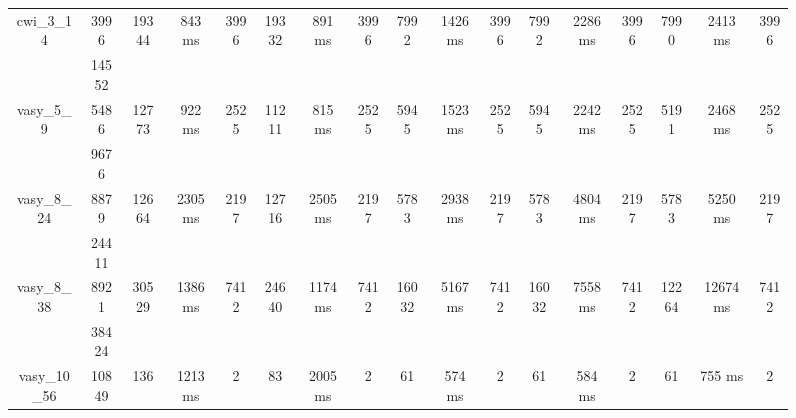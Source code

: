 \documentclass[../master/master.tex]{subfiles}
\begin{document}
\begin{figure}
\begin{adjustbox}{angle=90}
\begin{tabular}{ |c|c||c|c|c||c|c|c||c|c|c||c|c|c||c|c|c|| }
\hline
\multirow{2}{3.6em}{cwi\_3\_14} & 3996 & \multirow{2}{3.6em}{19344} & \multirow{2}{3.6em}{843 ms} & \multirow{2}{3.6em}{3996} & \multirow{2}{3.6em}{19332} & \multirow{2}{3.6em}{891 ms} & \multirow{2}{3.6em}{3996} & \multirow{2}{3.6em}{7992} & \multirow{2}{3.6em}{1426 ms} & \multirow{2}{3.6em}{3996} & \multirow{2}{3.6em}{7992} & \multirow{2}{3.6em}{2286 ms} & \multirow{2}{3.6em}{3996} & \multirow{2}{3.6em}{7990} & \multirow{2}{3.6em}{2413 ms} & \multirow{2}{3.6em}{3996} \\
\cline{2-2}
 & 14552  &  &  &  &  &  &  &  &  &  &  &  &  &  &  &  \\
\hline
\multirow{2}{3.6em}{vasy\_5\_9} & 5486 & \multirow{2}{3.6em}{12773} & \multirow{2}{3.6em}{922 ms} & \multirow{2}{3.6em}{2525} & \multirow{2}{3.6em}{11211} & \multirow{2}{3.6em}{815 ms} & \multirow{2}{3.6em}{2525} & \multirow{2}{3.6em}{5945} & \multirow{2}{3.6em}{1523 ms} & \multirow{2}{3.6em}{2525} & \multirow{2}{3.6em}{5945} & \multirow{2}{3.6em}{2242 ms} & \multirow{2}{3.6em}{2525} & \multirow{2}{3.6em}{5191} & \multirow{2}{3.6em}{2468 ms} & \multirow{2}{3.6em}{2525} \\
\cline{2-2}
 & 9676  &  &  &  &  &  &  &  &  &  &  &  &  &  &  &  \\
\hline
\multirow{2}{3.6em}{vasy\_8\_24} & 8879 & \multirow{2}{3.6em}{12664} & \multirow{2}{3.6em}{2305 ms} & \multirow{2}{3.6em}{2197} & \multirow{2}{3.6em}{12716} & \multirow{2}{3.6em}{2505 ms} & \multirow{2}{3.6em}{2197} & \multirow{2}{3.6em}{5783} & \multirow{2}{3.6em}{2938 ms} & \multirow{2}{3.6em}{2197} & \multirow{2}{3.6em}{5783} & \multirow{2}{3.6em}{4804 ms} & \multirow{2}{3.6em}{2197} & \multirow{2}{3.6em}{5783} & \multirow{2}{3.6em}{5250 ms} & \multirow{2}{3.6em}{2197} \\
\cline{2-2}
 & 24411  &  &  &  &  &  &  &  &  &  &  &  &  &  &  &  \\
\hline
\multirow{2}{3.6em}{vasy\_8\_38} & 8921 & \multirow{2}{3.6em}{30529} & \multirow{2}{3.6em}{1386 ms} & \multirow{2}{3.6em}{7412} & \multirow{2}{3.6em}{24640} & \multirow{2}{3.6em}{1174 ms} & \multirow{2}{3.6em}{7412} & \multirow{2}{3.6em}{16032} & \multirow{2}{3.6em}{5167 ms} & \multirow{2}{3.6em}{7412} & \multirow{2}{3.6em}{16032} & \multirow{2}{3.6em}{7558 ms} & \multirow{2}{3.6em}{7412} & \multirow{2}{3.6em}{12264} & \multirow{2}{3.6em}{12674 ms} & \multirow{2}{3.6em}{7412} \\
\cline{2-2}
 & 38424  &  &  &  &  &  &  &  &  &  &  &  &  &  &  &  \\
\hline
\multirow{2}{3.6em}{vasy\_10\_56} & 10849 & \multirow{2}{3.6em}{136} & \multirow{2}{3.6em}{1213 ms} & \multirow{2}{3.6em}{2} & \multirow{2}{3.6em}{83} & \multirow{2}{3.6em}{2005 ms} & \multirow{2}{3.6em}{2} & \multirow{2}{3.6em}{61} & \multirow{2}{3.6em}{574 ms} & \multirow{2}{3.6em}{2} & \multirow{2}{3.6em}{61} & \multirow{2}{3.6em}{584 ms} & \multirow{2}{3.6em}{2} & \multirow{2}{3.6em}{61} & \multirow{2}{3.6em}{755 ms} & \multirow{2}{3.6em}{2} \\

\end{tabular}
\end{adjustbox}
\end{figure}
\end{document}
